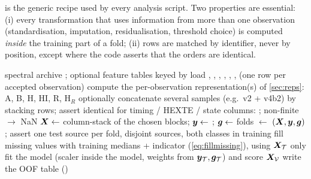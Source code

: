  is the generic recipe used by every analysis script. Two properties are essential: (i) every
transformation that uses information from more than one observation (standardisation, imputation, residualisation,
threshold choice) is computed \emph{inside} the training part of a fold; (ii) rows are matched by identifier, never by
position, except where the code asserts that the orders are identical.

\begin{algorithm}[htbp]
\caption{Building $(\Xm,\yv,\gv)$ for one analysis (generic; concrete versions in the phase chapters)}\label{alg:buildX}
\begin{algorithmic}[1]
\Require spectral archive ; optional feature tables keyed by 
\State load , , , , , ,  (one row per accepted observation)
\State compute the per-observation representation(s) of \cref{sec:reps}: A, B, H, HI, R, H$_R$ 
\State optionally concatenate several samples (e.g.\ v2 + v4b2) by stacking rows; assert identical 
\State for timing / HEXTE / state columns: ; non-finite $\to$ NaN
\State $\bm{X} \gets$ column-stack of the chosen blocks; $\bm{y}\gets$ ; $\bm{g}\gets$ 
\State folds $\gets$ $(\Xm,\yv,\gv)$; assert one test source per fold, disjoint sources, both classes in training
   \State fill missing values with training medians + indicator (\cref{eq:fillmissing}), using $\bm{X}_\mathcal{T}$ only
   \State fit the model (scaler inside the model, weights from $\bm{y}_\mathcal{T},\bm{g}_\mathcal{T}$) and score $\bm{X}_\mathcal{V}$
\EndFor
\State write the OOF table ()
\end{algorithmic}
\end{algorithm}

